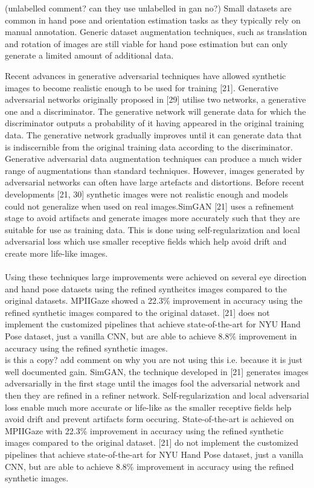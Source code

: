 \documentclass{article}
\begin{document}
(unlabelled comment? can they use unlabelled in gan no?)
Small datasets are common in hand pose and orientation estimation tasks as they typically rely on manual annotation.   Generic dataset augmentation techniques, such as translation and rotation of images are still viable for hand pose estimation but can only generate a limited amount of additional data. 

Recent advances in generative adversarial techniques have allowed synthetic images to become realistic enough to be used for training [21]. Generative adversarial networks originally proposed in [29] utilise two networks, a generative one and a discriminator. The generative network will generate data for which the discriminator outputs a probability of it having appeared in the original training data. The generative network gradually improves until it can generate data that is indiscernible from the original training data according to the discriminator. \\

Generative adversarial data augmentation techniques can produce a much wider range of augmentations than standard techniques. However, images generated by adversarial networks can often have large artefacts and distortions. Before recent developments [21, 30] synthetic images were not realistic enough and models could not generalize when used on real images.SimGAN [21] uses a refinement stage to avoid artifacts and generate images more accurately such that they are suitable for use as training data. This is done using self-regularization and local adversarial loss which use smaller receptive fields which help avoid drift and create more life-like images.\\\\

Using these techniques large improvements were achieved on several eye direction and hand pose datasets using the refined syntheitcs images compared to the original datasets. MPIIGaze showed a 22.3\% improvement in accuracy using the refined synthetic images compared to the original dataset. [21] does not implement the customized pipelines that achieve state-of-the-art for NYU Hand Pose dataset, just a vanilla CNN, but are able to achieve 8.8\% improvement in accuracy using the refined synthetic images.\\

 
is this a copy? add comment on why you are not using this i.e. because it is just well documented gain. 
SimGAN, the technique developed in [21] generates images adversarially in the first stage until the images fool the adversarial network and then they are refined  in a refiner network. Self-regularization and local adversarial loss enable much more accurate or life-like as the smaller receptive fields help avoid drift and prevent artifacts form occuring. State-of-the-art is achieved on MPIIGaze with 22.3\% improvement in accuracy using the refined synthetic images compared to the original dataset. [21] do not implement the customized pipelines that achieve state-of-the-art for NYU Hand Pose dataset, just a vanilla CNN, but are able to achieve 8.8\% improvement in accuracy using the refined synthetic images.\\
\end{document}
